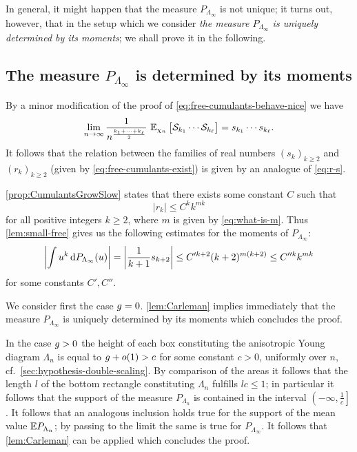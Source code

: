 \documentclass[12pt,usenames,dvipsnames,svgnames,table]{amsart}
\begin{document}
In general, it might happen that the measure $P_{\Lambda_\infty}$ is not unique;
it turns out, however, 
that in the setup which we consider 
\emph{the measure $P_{\Lambda_\infty}$ is uniquely
	determined by its moments}; we shall prove it in the following.

\subsection{The measure $P_{\Lambda_\infty}$ is determined by its moments}
By a minor modification of the proof of \eqref{eq:free-cumulants-behave-nice} we have
\begin{equation}
\label{eq:free-cumulants-behave-nice-B}
\lim_{n\to\infty} \frac{1}{n^{\frac{k_1+\cdots+k_\ell}{2}}} 
\ \mathbb{E}_{\chi_n}\left[ \mathcal{S}_{k_1} \cdots \mathcal{S}_{k_\ell} \right]  =
s_{k_1} \cdots s_{k_\ell}.
\end{equation}
It follows that the relation between the families of real numbers
$(s_k)_{k\geq 2}$ and $(r_k)_{k \geq 2}$ (given by \eqref{eq:free-cumulants-exist})
is given by an analogue of \eqref{eq:r-s}.

\cref{prop:CumulantsGrowSlow} states that there exists some constant
$C$ such that
\[ |r_k| \leq C^{k} k^{mk}  \]
for all positive integers $k \geq 2$, where  $m$ is given by \eqref{eq:what-is-m}.
Thus \cref{lem:small-free}
gives us the following estimates for the moments of
$P_{\Lambda_\infty}$:
\[ \left| \int u^k \dif P_{\Lambda_\infty}(u) \right| = 
\left| \frac{1}{k+1} s_{k+2} \right| \leq
C'^{k+2} (k+2)^{m(k+2)}\leq C''^kk^{mk}\]
for some constants $C',C''$.

\medskip

We consider first the case $g=0$.
\cref{lem:Carleman} implies immediately that the measure $P_{\Lambda_\infty}$ is uniquely determined by its moments
which concludes the proof.

\medskip

In the case $g>0$ the height of each box constituting the anisotropic Young diagram
$\Lambda_n$ is equal to $g+o(1)>c$ for some constant $c>0$, uniformly over $n$, 
cf.~\cref{sec:hypothesis-double-scaling}. By comparison of the areas it follows that the length $l$ of the 
bottom rectangle constituting $\Lambda_n$ fulfills
$ l c \leq 1 $; in particular it follows that the support of the measure 
$P_{\Lambda_n}$ 
is contained in the interval $\left( -\infty, \frac{1}{c} \right]$.
It follows that an analogous inclusion holds true for the support of the mean value
$\mathbb{E} P_{\Lambda_n}$; by passing to the limit the same is true for $P_{\Lambda_\infty}$. 
It follows that \cref{lem:Carleman} can be applied which concludes the proof.
\end{document}
